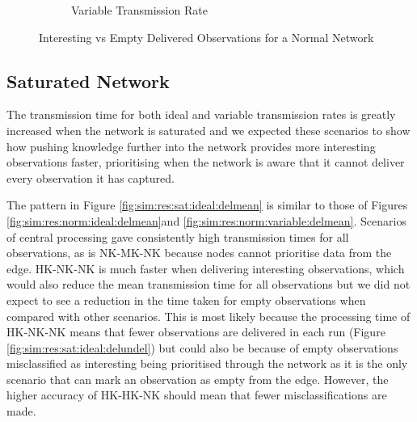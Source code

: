 \begin{figure}[H]
\begin{subfigure}{.5\textwidth}
  \caption{Variable Transmission Rate}
	\label{fig:sim:res:norm:variable:emptint}
\end{subfigure}
\caption{Interesting vs Empty Delivered Observations for a Normal Network}
\end{figure}

\subsection{Saturated Network}
The transmission time for both ideal and variable transmission rates is greatly increased when the network is saturated and we expected these scenarios to show how pushing knowledge further into the network provides more interesting observations faster, prioritising when the network is aware that it cannot deliver every observation it has captured.

	The pattern in Figure \ref{fig:sim:res:sat:ideal:delmean} is similar to those of Figures \ref{fig:sim:res:norm:ideal:delmean}and \ref{fig:sim:res:norm:variable:delmean}. Scenarios of central processing gave consistently high transmission times for all observations, as is NK-MK-NK because nodes cannot prioritise data from the edge. HK-NK-NK is much faster when delivering interesting observations, which would also reduce the mean transmission time for all observations but we did not expect to see a reduction in the time taken for empty observations when compared with other scenarios. This is most likely because the processing time of HK-NK-NK means that fewer observations are delivered in each run (Figure \ref{fig:sim:res:sat:ideal:delundel}) but could also be because of empty observations misclassified as interesting being prioritised through the network as it is the only scenario that can mark an observation as empty from the edge. However, the higher accuracy of HK-HK-NK should mean that fewer misclassifications are made. 
	
